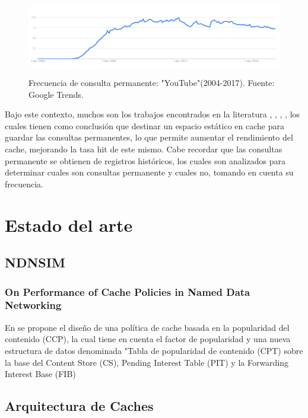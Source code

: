 \documentclass[12pt]{ociamthesis}  %
\begin{document}
\begin{figure}[!htb]
	\centering
	\includegraphics[width=15cm]{YouTube.png}\\
	\caption{Frecuencia de consulta permanente: "YouTube"(2004-2017). Fuente: Google Trends.}
	\label{google_trend_google}
\end{figure}

Bajo este contexto, muchos son los trabajos encontrados en la literatura \cite{zhang2013two}, \cite{markatos2001caching}, \cite{ozcan2012five}, \cite{kumar2008new}, los cuales tienen como conclusión que destinar un espacio estático en cache para guardar las consultas permanentes, lo que permite aumentar el rendimiento del cache, mejorando la tasa hit de este mismo. Cabe recordar que las consultas permanente se obtienen de registros históricos, los cuales son analizados para determinar cuales son consultas permanente y cuales no, tomando en cuenta su frecuencia. \\ 


\chapter{Estado del arte}
\section{NDNSIM}
\subsection{On Performance of Cache Policies in Named Data Networking}

En \cite{ran2013performance} se propone el diseño de una política de cache basada en la popularidad del contenido (CCP), la cual tiene en cuenta el factor de popularidad y una nueva estructura de datos denominada "Tabla de popularidad de contenido (CPT) sobre la base del Content Store (CS), Pending Interest Table (PIT) y la Forwarding Interest Base (FIB)

\section{Arquitectura de Caches}


\end{document}
